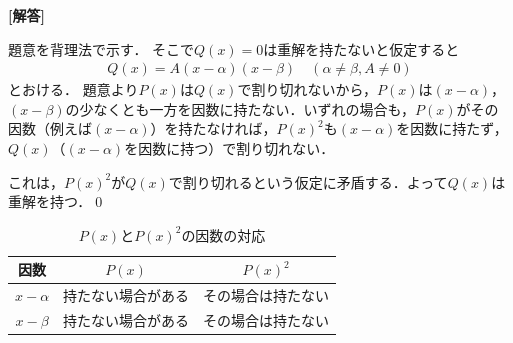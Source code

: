 \documentclass[../../main.tex]{subfiles}
\begin{document}
\begin{oframed}
  
\end{oframed}

{\bf [解答]}

題意を背理法で示す．
そこで$Q(x)=0$は重解を持たないと仮定すると
\begin{align}
  Q(x)=A(x-\alpha)(x-\beta) \quad (\alpha\ne\beta, A\ne0) \label{eq:1}
\end{align}
とおける．
題意より$P(x)$は$Q(x)$で割り切れないから，$P(x)$は$(x-\alpha)$，$(x-\beta)$の少なくとも一方を因数に持たない．いずれの場合も，$P(x)$がその因数（例えば$(x-\alpha)$）を持たなければ，$P(x)^2$も$(x-\alpha)$を因数に持たず，$Q(x)$（$(x-\alpha)$を因数に持つ）で割り切れない．

これは，$P(x)^2$が$Q(x)$で割り切れるという仮定に矛盾する．よって$Q(x)$は重解を持つ．\qed

\begin{table}[htb]
  \centering
  \caption{$P(x)$と$P(x)^2$の因数の対応}
  \begin{tabular}{c|cc}
    因数 & $P(x)$ & $P(x)^2$ \\
    \hline
    $x-\alpha$ & 持たない場合がある & その場合は持たない \\
    $x-\beta$ & 持たない場合がある & その場合は持たない \\
  \end{tabular}
\end{table}

\newpage
\end{document}
